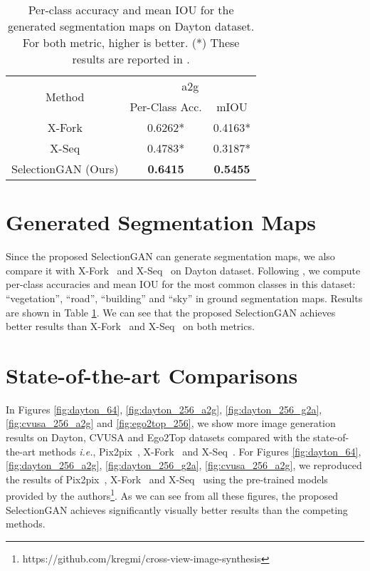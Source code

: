 \documentclass[10pt,twocolumn,letterpaper]{article}
\begin{document}
\begin{table}[!ht]\small
	\centering
	\caption{Per-class accuracy and mean IOU for the generated segmentation maps on Dayton dataset. For both metric, higher is better. (*) These results are reported in \cite{regmi2018cross}.}
	\begin{tabular}{ccc} \toprule
		\multirow{2}{*}{Method}  & \multicolumn{2}{c}{a2g}  \\ \cmidrule(lr){2-3}  
		& Per-Class Acc.   & mIOU    \\ \midrule	
		X-Fork \cite{regmi2018cross}  & 0.6262*&0.4163* \\
		X-Seq \cite{regmi2018cross}   & 0.4783*&0.3187*\\
		SelectionGAN (Ours)	& \textbf{0.6415} & \textbf{0.5455}\\             	
		\bottomrule		
	\end{tabular}
	\label{tab:seg}
\end{table}

\section{Generated Segmentation Maps}
\label{supp:5}
Since the proposed SelectionGAN can generate segmentation maps, we also compare it with X-Fork~\cite{regmi2018cross} and X-Seq~\cite{regmi2018cross} on Dayton dataset.
Following \cite{regmi2018cross}, we compute per-class accuracies and mean IOU for the most common classes in this dataset: ``vegetation'', ``road'', ``building'' and ``sky'' in
ground segmentation maps.
Results are shown in Table \ref{tab:seg}.
We can see that the proposed SelectionGAN achieves better results than X-Fork~\cite{regmi2018cross} and X-Seq~\cite{regmi2018cross} on both metrics.

\section{State-of-the-art Comparisons}
\label{supp:6}
In Figures \ref{fig:dayton_64}, \ref{fig:dayton_256_a2g}, \ref{fig:dayton_256_g2a}, \ref{fig:cvusa_256_a2g} and \ref{fig:ego2top_256}, we show more image generation results on Dayton, CVUSA and Ego2Top datasets compared with the state-of-the-art methods \emph{i.e.}, Pix2pix~\cite{isola2017image}, X-Fork~\cite{regmi2018cross} and X-Seq~\cite{regmi2018cross}.
For Figures \ref{fig:dayton_64}, \ref{fig:dayton_256_a2g}, \ref{fig:dayton_256_g2a}, \ref{fig:cvusa_256_a2g}, we reproduced the results of Pix2pix~\cite{isola2017image}, X-Fork~\cite{regmi2018cross} and X-Seq~\cite{regmi2018cross} using the pre-trained models provided by the authors\footnote{https://github.com/kregmi/cross-view-image-synthesis}.
As we can see from all these figures, the proposed SelectionGAN achieves significantly visually better results than the competing methods.
\end{document}

